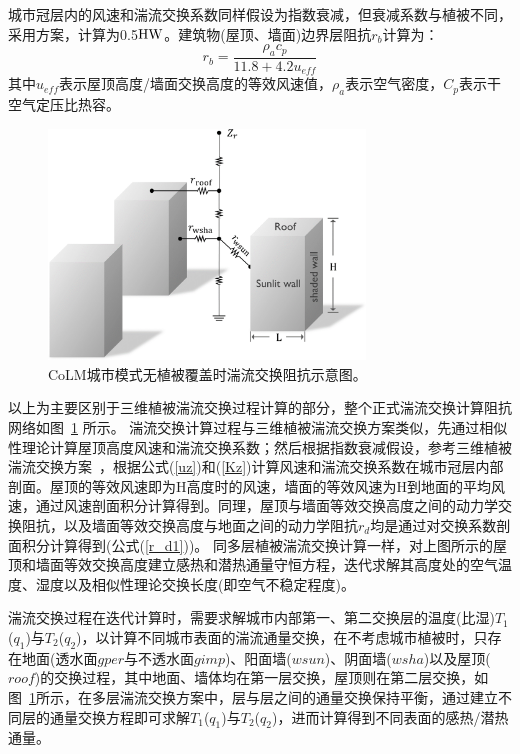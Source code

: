 城市冠层内的风速和湍流交换系数同样假设为指数衰减，但衰减系数与植被不同，
采用\citet{masson2000physically}方案，计算为0.5${\rm HW}$。建筑物(屋顶、墙面)边界层阻抗$r_b$计算为\citep{oleson2008urban}：
\begin{equation}
r_{b}=\frac{\rho_{a} c_{p}}{11.8+4.2 u_{e f f}}
\end{equation}
其中$u_{eff}$表示屋顶高度/墙面交换高度的等效风速值，$\rho_a$表示空气密度，$C_p$表示干空气定压比热容。

{
\begin{figure}[htbp]
\centering
\includegraphics[width=0.75\textwidth]{Figures/城市模式/CoLM城市模式无植被阻抗交换网络.png}
\caption{CoLM城市模式无植被覆盖时湍流交换阻抗示意图。}
\label{fig:无植被覆盖时城市湍流交换阻抗示意图}
\end{figure}
}

以上为主要区别于三维植被湍流交换过程计算的部分，整个正式湍流交换计算阻抗网络如图~\ref{fig:无植被覆盖时城市湍流交换阻抗示意图} 所示。
湍流交换计算过程与三维植被湍流交换方案类似，先通过相似性理论计算屋顶高度风速和湍流交换系数；然后根据指数衰减假设，参考三维植被湍流交换方案~\citep{dai2019different}，根据公式(\ref{uz})和(\ref{Kz})计算风速和湍流交换系数在城市冠层内部剖面。屋顶的等效风速即为H高度时的风速，墙面的等效风速为H到地面的平均风速，通过风速剖面积分计算得到。同理，屋顶与墙面等效交换高度之间的动力学交换阻抗，以及墙面等效交换高度与地面之间的动力学阻抗$r_d$均是通过对交换系数剖面积分计算得到(公式(\ref{r_d1}))。
同多层植被湍流交换计算一样，对上图所示的屋顶和墙面等效交换高度建立感热和潜热通量守恒方程，迭代求解其高度处的空气温度、湿度以及相似性理论交换长度(即空气不稳定程度)。

湍流交换过程在迭代计算时，需要求解城市内部第一、第二交换层的温度(比湿)$T_1$($q_1$)与$T_2$($q_2$)，以计算不同城市表面的湍流通量交换，在不考虑城市植被时，只存在地面(透水面$gper$与不透水面$gimp$)、阳面墙($wsun$)、阴面墙($wsha$)以及屋顶($roof$)的交换过程，其中地面、墙体均在第一层交换，屋顶则在第二层交换，如图~\ref{fig:无植被覆盖时城市湍流交换阻抗示意图}所示，在多层湍流交换方案中，层与层之间的通量交换保持平衡，通过建立不同层的通量交换方程即可求解$T_1$($q_1$)与$T_2$($q_2$)，进而计算得到不同表面的感热/潜热通量。

